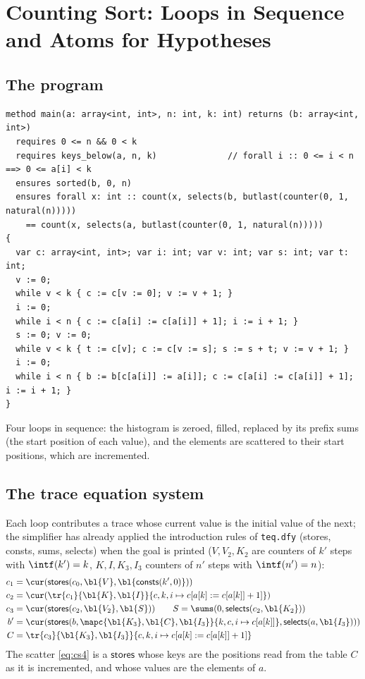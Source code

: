 \section{Counting Sort: Loops in Sequence and Atoms for Hypotheses}\label{sec:cs}

\subsection{The program}
\begin{lstlisting}
method main(a: array<int, int>, n: int, k: int) returns (b: array<int, int>)
  requires 0 <= n && 0 < k
  requires keys_below(a, n, k)              // forall i :: 0 <= i < n ==> 0 <= a[i] < k
  ensures sorted(b, 0, n)
  ensures forall x: int :: count(x, selects(b, butlast(counter(0, 1, natural(n)))))
    == count(x, selects(a, butlast(counter(0, 1, natural(n)))))
{
  var c: array<int, int>; var i: int; var v: int; var s: int; var t: int;
  v := 0;
  while v < k { c := c[v := 0]; v := v + 1; }
  i := 0;
  while i < n { c := c[a[i] := c[a[i]] + 1]; i := i + 1; }
  s := 0; v := 0;
  while v < k { t := c[v]; c := c[v := s]; s := s + t; v := v + 1; }
  i := 0;
  while i < n { b := b[c[a[i]] := a[i]]; c := c[a[i] := c[a[i]] + 1]; i := i + 1; }
}
\end{lstlisting}
Four loops in sequence: the histogram is zeroed, filled, replaced by its prefix sums (the start position
of each value), and the elements are scattered to their start positions, which are incremented.

\subsection{The trace equation system}
Each loop contributes a trace whose current value is the initial value of the next; the simplifier has
already applied the introduction rules of \texttt{teq.dfy} (stores, consts, sums, selects) when the goal
is printed ($V, V_2, K_2$ are counters of $k'$ steps with $\intf(k') = k$, $K, I, K_3, I_3$ counters of
$n'$ steps with $\intf(n') = n$):
\begin{align}
  c_1 &= \cur(\mathsf{stores}(c_0, \bl{V}, \bl{\mathsf{consts}(k', 0)})) \label{eq:cs1}\\
  c_2 &= \cur(\tr{c_1}{\bl{K}, \bl{I}}{c, k, i \mapsto c[a[k] := c[a[k]] + 1]}) \label{eq:cs2}\\
  c_3 &= \cur(\mathsf{stores}(c_2, \bl{V_2}, \bl{S})) \qquad S = \sums(0, \mathsf{selects}(c_2, \bl{K_2})) \label{eq:cs3}\\
  b' &= \cur(\mathsf{stores}(b, \mapc{\bl{K_3}, \bl{C}, \bl{I_3}}{k, c, i \mapsto c[a[k]]}, \mathsf{selects}(a, \bl{I_3}))) \label{eq:cs4}\\
  C &= \tr{c_3}{\bl{K_3}, \bl{I_3}}{c, k, i \mapsto c[a[k] := c[a[k]] + 1]} \label{eq:cs5}
\end{align}
The scatter \eqref{eq:cs4} is a $\mathsf{stores}$ whose keys are the positions read from the table $C$ as
it is incremented, and whose values are the elements of $a$.

